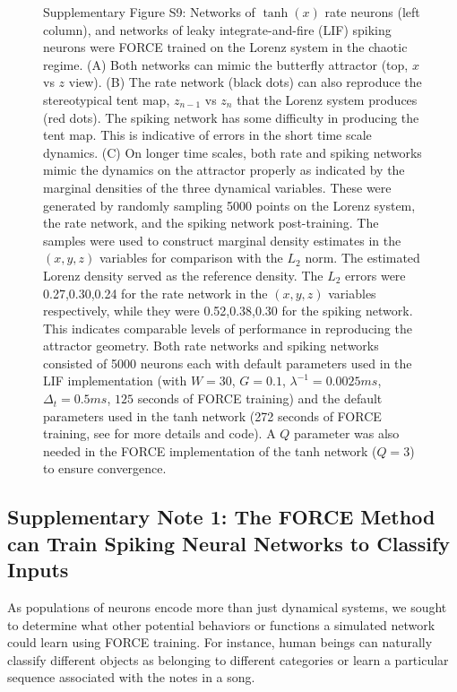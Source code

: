 \documentclass[11pt]{article} %
\begin{document}
\begin{figure}[htp!]
\caption*{Supplementary Figure S9:  Networks of $\tanh(x)$ rate neurons (left column), and networks of leaky integrate-and-fire (LIF) spiking neurons were FORCE trained on the Lorenz system in the chaotic regime.   (A) Both networks can mimic the butterfly attractor (top, $x$ vs $z$ view).   (B) The rate network (black dots) can also reproduce the stereotypical tent map, $z_{n-1}$ vs $z_n$ that the Lorenz system produces (red dots).  The spiking network has some difficulty in producing the tent map.  This is indicative of errors in the short time scale dynamics.  (C) On longer time scales, both rate and spiking networks mimic the dynamics on the attractor properly as indicated by the marginal densities of the three dynamical variables.  These were generated by randomly sampling 5000 points on the Lorenz system, the rate network, and the spiking network post-training.  The samples were used to construct marginal density estimates in the $(x,y,z)$ variables for comparison with the $L_2$ norm.  The estimated Lorenz density served as the reference density.    The $L_2$ errors were 0.27,0.30,0.24 for the rate network in the $(x,y,z)$ variables respectively, while they were 0.52,0.38,0.30 for the spiking network.  This indicates comparable levels of performance in reproducing the attractor geometry.  Both rate networks and spiking networks consisted of 5000 neurons each with default parameters used in the LIF implementation (with $W = 30$, $G=0.1$, $\lambda^{-1} = 0.0025 ms$, $\Delta_t = 0.5 ms$, $125$ seconds of FORCE training) and the default parameters used in the tanh network (272 seconds of FORCE training, see \cite{FORCE1} for more details and code).  A $Q$ parameter was also needed in the FORCE implementation of the tanh network ($Q=3$) to ensure convergence. } 
\end{figure}


\clearpage



\subsection*{Supplementary Note 1: The FORCE Method can Train Spiking Neural Networks to Classify Inputs} 

As populations of neurons encode more than just dynamical systems, we sought to determine what other potential behaviors or functions a simulated network could learn using FORCE training.  For instance, human beings can naturally classify different objects as belonging to different categories or learn a particular sequence associated with the notes in a song.  
\end{document}
